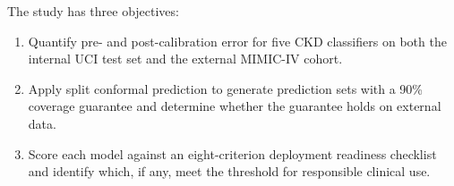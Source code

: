 The study has three objectives:
\begin{enumerate}
    \item Quantify pre- and post-calibration error for five CKD classifiers on
          both the internal UCI test set and the external MIMIC-IV cohort.
    \item Apply split conformal prediction to generate prediction sets with a
          90\% coverage guarantee and determine whether the guarantee holds on
          external data.
    \item Score each model against an eight-criterion deployment readiness
          checklist and identify which, if any, meet the threshold for
          responsible clinical use.
\end{enumerate}
